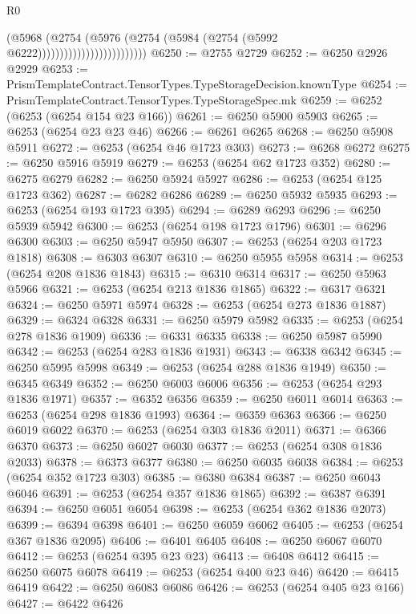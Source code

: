 \begin{lexlean}{R0}
\begin{coremodule}
                                        (@5968
                                          (@2754
                                            (@5976
                                              (@2754
                                                (@5984 (@2754 (@5992 @6222)))))))))))))))))))))))))
@6250 := @2755 @2729
@6252 := @6250 @2926 @2929
@6253 := PrismTemplateContract.TensorTypes.TypeStorageDecision.knownType
@6254 := PrismTemplateContract.TensorTypes.TypeStorageSpec.mk
@6259 := @6252 (@6253 (@6254 @154 @23 @166))
@6261 := @6250 @5900 @5903
@6265 := @6253 (@6254 @23 @23 @46)
@6266 := @6261 @6265
@6268 := @6250 @5908 @5911
@6272 := @6253 (@6254 @46 @1723 @303)
@6273 := @6268 @6272
@6275 := @6250 @5916 @5919
@6279 := @6253 (@6254 @62 @1723 @352)
@6280 := @6275 @6279
@6282 := @6250 @5924 @5927
@6286 := @6253 (@6254 @125 @1723 @362)
@6287 := @6282 @6286
@6289 := @6250 @5932 @5935
@6293 := @6253 (@6254 @193 @1723 @395)
@6294 := @6289 @6293
@6296 := @6250 @5939 @5942
@6300 := @6253 (@6254 @198 @1723 @1796)
@6301 := @6296 @6300
@6303 := @6250 @5947 @5950
@6307 := @6253 (@6254 @203 @1723 @1818)
@6308 := @6303 @6307
@6310 := @6250 @5955 @5958
@6314 := @6253 (@6254 @208 @1836 @1843)
@6315 := @6310 @6314
@6317 := @6250 @5963 @5966
@6321 := @6253 (@6254 @213 @1836 @1865)
@6322 := @6317 @6321
@6324 := @6250 @5971 @5974
@6328 := @6253 (@6254 @273 @1836 @1887)
@6329 := @6324 @6328
@6331 := @6250 @5979 @5982
@6335 := @6253 (@6254 @278 @1836 @1909)
@6336 := @6331 @6335
@6338 := @6250 @5987 @5990
@6342 := @6253 (@6254 @283 @1836 @1931)
@6343 := @6338 @6342
@6345 := @6250 @5995 @5998
@6349 := @6253 (@6254 @288 @1836 @1949)
@6350 := @6345 @6349
@6352 := @6250 @6003 @6006
@6356 := @6253 (@6254 @293 @1836 @1971)
@6357 := @6352 @6356
@6359 := @6250 @6011 @6014
@6363 := @6253 (@6254 @298 @1836 @1993)
@6364 := @6359 @6363
@6366 := @6250 @6019 @6022
@6370 := @6253 (@6254 @303 @1836 @2011)
@6371 := @6366 @6370
@6373 := @6250 @6027 @6030
@6377 := @6253 (@6254 @308 @1836 @2033)
@6378 := @6373 @6377
@6380 := @6250 @6035 @6038
@6384 := @6253 (@6254 @352 @1723 @303)
@6385 := @6380 @6384
@6387 := @6250 @6043 @6046
@6391 := @6253 (@6254 @357 @1836 @1865)
@6392 := @6387 @6391
@6394 := @6250 @6051 @6054
@6398 := @6253 (@6254 @362 @1836 @2073)
@6399 := @6394 @6398
@6401 := @6250 @6059 @6062
@6405 := @6253 (@6254 @367 @1836 @2095)
@6406 := @6401 @6405
@6408 := @6250 @6067 @6070
@6412 := @6253 (@6254 @395 @23 @23)
@6413 := @6408 @6412
@6415 := @6250 @6075 @6078
@6419 := @6253 (@6254 @400 @23 @46)
@6420 := @6415 @6419
@6422 := @6250 @6083 @6086
@6426 := @6253 (@6254 @405 @23 @166)
@6427 := @6422 @6426

\end{coremodule}
\end{lexlean}
